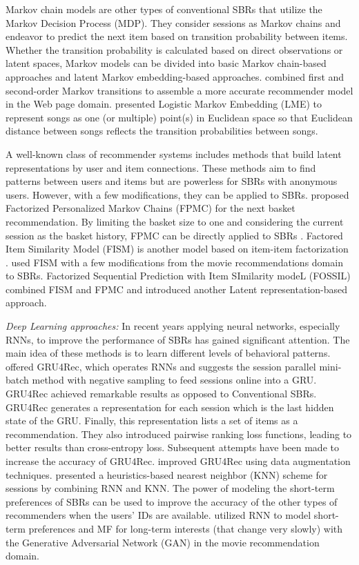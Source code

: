 \documentclass[3p, preprint, times]{elsarticle}
\begin{document}
Markov chain models are other types of conventional SBRs that utilize the Markov Decision Process (MDP). They consider sessions as Markov chains and endeavor to predict the next item based on transition probability between items. Whether the transition probability is calculated based on direct observations or latent spaces, Markov models can be divided into basic Markov chain-based approaches and latent Markov embedding-based approaches. \cite{zhang2007efficient} combined first and second-order Markov transitions to assemble a more accurate recommender model in the Web page domain. \cite{chen2012playlist} presented Logistic Markov Embedding (LME) to represent songs as one (or multiple) point(s) in Euclidean space so that Euclidean distance between songs reflects the transition probabilities between songs.

A well-known class of recommender systems includes methods that build latent representations by user and item connections. These methods aim to find patterns between users and items but are powerless for SBRs with anonymous users. However, with a few modifications, they can be applied to SBRs. \cite{rendle2010factorizing} proposed Factorized Personalized Markov Chains (FPMC) for the next basket recommendation. By limiting the basket size to one and considering the current session as the basket history, FPMC can be directly applied to SBRs \cite{ludewig2018evaluation}. Factored Item Similarity Model (FISM) is another model based on item-item factorization \cite{kabbur2013fism}. \cite{ludewig2018evaluation} used FISM with a few modifications from the movie recommendations domain to SBRs. Factorized Sequential Prediction with Item SImilarity modeL (FOSSIL) \cite{he2016fusing} combined FISM and FPMC and introduced another Latent representation-based approach.

\textit{Deep Learning approaches:} In recent years applying neural networks, especially RNNs, to improve the performance of SBRs has gained significant attention. The main idea of these methods is to learn different levels of behavioral patterns. \cite{hidasi2016session} offered GRU4Rec, which operates RNNs and suggests the session parallel mini-batch method with negative sampling to feed sessions online into a GRU. GRU4Rec achieved remarkable results as opposed to Conventional SBRs. GRU4Rec generates a representation for each session which is the last hidden state of the GRU. Finally, this representation lists a set of items as a recommendation. They also introduced pairwise ranking loss functions, leading to better results than cross-entropy loss. Subsequent attempts have been made to increase the accuracy of GRU4Rec. \cite{tan2016improved} improved GRU4Rec using data augmentation techniques. \cite{jannach2017recurrent} presented a heuristics-based nearest neighbor (KNN) scheme for sessions by combining RNN and KNN. The power of modeling the short-term preferences of SBRs can be used to improve the accuracy of the other types of recommenders when the users' IDs are available. \cite{zhao2019leveraging} utilized RNN to model short-term preferences and MF for long-term interests (that change very slowly) with the Generative Adversarial Network (GAN) in the movie recommendation domain.
\end{document}
